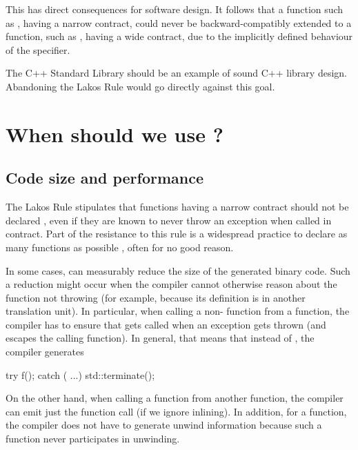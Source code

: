 This has direct consequences for software design. It follows that a function such as , having a narrow contract, could never be backward-compatibly extended to a function, such as , having a wide contract, due to the implicitly defined behaviour of the  specifier. 

The C++ Standard Library should be an example of sound C++ library design. Abandoning the Lakos Rule would go directly against this goal.

\section{When should we use ?}
\label{sec:noexcept}

\subsection{Code size and performance}

The Lakos Rule stipulates that functions having a narrow contract should not be declared , even if they are known to never throw an exception when called in contract. Part of the resistance to this rule is a widespread practice to declare as many functions as possible , often for no good reason.

In some cases,  can measurably reduce the size of the generated binary code. Such a reduction might occur when the compiler cannot otherwise reason about the function not throwing (for example, because its definition is in another translation unit). In particular, when calling a non- function  from a  function, the compiler has to ensure that  gets called when an exception gets thrown (and escapes the calling function). In general, that means that instead of , the compiler generates
\begin{codeblock}
try { f(); } catch ( ...) { std::terminate(); }
\end{codeblock}
On the other hand, when calling a  function from another  function, the compiler can emit just the function call (if we ignore inlining). In addition, for a  function, the compiler does not have to generate unwind information because such a function never participates in unwinding.

